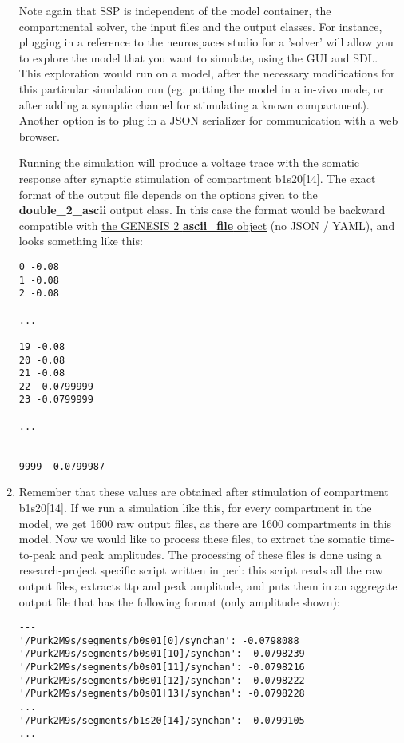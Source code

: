 \documentclass[12pt]{article}
\begin{document}
\begin{enumerate}
  Note again that SSP is independent of the model container, the
  compartmental solver, the input files and the output classes.  For
  instance, plugging in a reference to the neurospaces studio for a
  'solver' will allow you to explore the model that you want to
  simulate, using the GUI and SDL.  This exploration would run on a
  model, after the necessary modifications for this particular
  simulation run (eg. putting the model in a in-vivo mode, or after
  adding a synaptic channel for stimulating a known compartment).
  Another option is to plug in a JSON serializer for communication
  with a web browser.

  Running the simulation will produce a voltage trace with the somatic
  response after synaptic stimulation of compartment b1s20[14].  The
  exact format of the output file depends on the options given to the
  {\bf double\_2\_ascii} output class.  In this case the format would
  be backward compatible with
  \href{http://www.genesis-sim.org/GENESIS/Hyperdoc/Manual-26.html#ss26.7}{the
    GENESIS 2 {\bf ascii\_file} object} (no JSON / YAML), and looks
  something like this:

\begin{verbatim}
0 -0.08
1 -0.08
2 -0.08

...

19 -0.08
20 -0.08
21 -0.08
22 -0.0799999
23 -0.0799999

...


9999 -0.0799987
\end{verbatim}

\item Remember that these values are obtained after stimulation of
  compartment b1s20[14].  If we run a simulation like this, for every
  compartment in the model, we get 1600 raw output files, as there are
  1600 compartments in this model.  Now we would like to process these
  files, to extract the somatic time-to-peak and peak amplitudes.  The
  processing of these files is done using a research-project specific
  script written in perl: this script reads all the raw output files,
  extracts ttp and peak amplitude, and puts them in an aggregate
  output file that has the following format (only amplitude shown):

\begin{verbatim}
---
'/Purk2M9s/segments/b0s01[0]/synchan': -0.0798088
'/Purk2M9s/segments/b0s01[10]/synchan': -0.0798239
'/Purk2M9s/segments/b0s01[11]/synchan': -0.0798216
'/Purk2M9s/segments/b0s01[12]/synchan': -0.0798222
'/Purk2M9s/segments/b0s01[13]/synchan': -0.0798228
...
'/Purk2M9s/segments/b1s20[14]/synchan': -0.0799105
...
\end{verbatim}


\end{enumerate}
\end{document}
